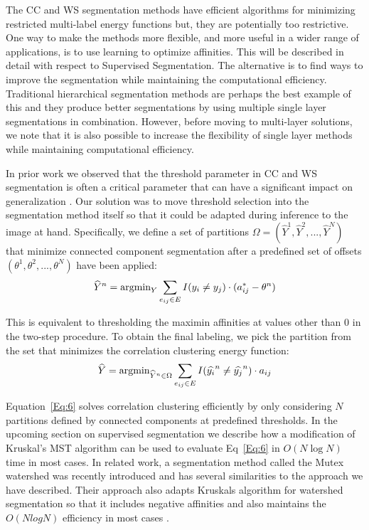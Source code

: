 \documentclass[letterpaper,twocolumn,fleqn]{article}
\begin{document}
The CC and WS segmentation methods have efficient algorithms for minimizing restricted multi-label energy functions but, they are potentially too restrictive. One way to make the methods more flexible, and more useful in a wider range of applications, is to use learning to optimize affinities. This will be  described in detail with respect to Supervised Segmentation. The alternative is to find ways to improve the segmentation while maintaining the computational efficiency. Traditional hierarchical segmentation methods are perhaps the best example of this and they produce better segmentations by using multiple single layer segmentations in combination. However, before moving to multi-layer solutions, we note that it is also possible to increase the flexibility of single layer methods while maintaining computational efficiency.

In prior work we observed that the threshold parameter in CC and WS segmentation is often a critical parameter that can have a significant impact on generalization \cite{Nguyen2019}. Our solution was to move threshold selection into the segmentation method itself so that it could be adapted during inference to the image at hand. Specifically, we define a set of partitions $\Omega = \left(\widehat{Y}^1, \widehat{Y}^2, ..., \widehat{Y}^N\right)$ that minimize connected component segmentation after a predefined set of offsets $\left(\theta^1, \theta^2, ..., \theta^N\right)$ have been applied:
\begin{equation}
    \widehat{Y}^n =\hbox{argmin}_Y\sum_{e_{ij}\in E} I(y_i \neq y_j)\cdot (a_{ij}^*-\theta^n)
   \label{Eq:5}
\end{equation}

This is equivalent to thresholding the maximin affinities at values other than $0$ in the two-step procedure. To obtain the final labeling, we pick the partition from the set that minimizes the correlation clustering energy function:  
\begin{equation}
    \widehat{Y} =\hbox{argmin}_{\widehat{Y}^n \in \Omega} \sum_{e_{ij}\in E} I(\widehat{y_i}^n \neq \widehat{y_j}^n)\cdot a_{ij}
    \label{Eq:6}
\end{equation}

Equation~\ref{Eq:6} solves correlation clustering efficiently by only considering $N$ partitions defined by connected components at predefined thresholds. In the upcoming section on supervised segmentation we describe how a modification of Kruskal's MST algorithm can be used to evaluate Eq~\ref{Eq:6} in $O(N\log N)$ time in most cases. In related work, a segmentation method called the Mutex watershed was recently introduced and has several similarities to the approach we have described. Their approach also adapts Kruskals algorithm for watershed segmentation so that it includes negative affinities and also maintains the $O(NlogN)$ efficiency in most cases \cite{Wolf2019}. 
\end{document}
